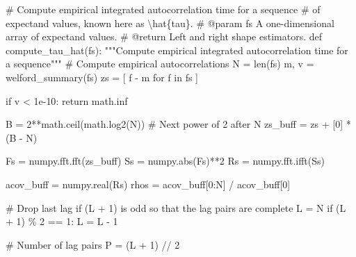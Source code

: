 \documentclass[
  letterpaper,
  DIV=11,
  numbers=noendperiod]{scrartcl}
\newenvironment{Shaded}{\begin{snugshade}}{\end{snugshade}}
\newcommand{\BuiltInTok}[1]{\textcolor[rgb]{0.00,0.23,0.31}{#1}}
\newcommand{\CommentTok}[1]{\textcolor[rgb]{0.37,0.37,0.37}{#1}}
\newcommand{\ControlFlowTok}[1]{\textcolor[rgb]{0.00,0.23,0.31}{#1}}
\newcommand{\DecValTok}[1]{\textcolor[rgb]{0.68,0.00,0.00}{#1}}
\newcommand{\FloatTok}[1]{\textcolor[rgb]{0.68,0.00,0.00}{#1}}
\newcommand{\KeywordTok}[1]{\textcolor[rgb]{0.00,0.23,0.31}{#1}}
\newcommand{\NormalTok}[1]{\textcolor[rgb]{0.00,0.23,0.31}{#1}}
\newcommand{\OperatorTok}[1]{\textcolor[rgb]{0.37,0.37,0.37}{#1}}
\begin{document}
\begin{Shaded}
\begin{Highlighting}[]

\CommentTok{\# Compute empirical integrated autocorrelation time for a sequence}
\CommentTok{\# of expectand values, known here as \textbackslash{}hat\{tau\}.}
\CommentTok{\# @param fs A one{-}dimensional array of expectand values.}
\CommentTok{\# @return Left and right shape estimators.}
\KeywordTok{def}\NormalTok{ compute\_tau\_hat(fs):}
  \CommentTok{"""Compute empirical integrated autocorrelation time for a sequence"""}
  \CommentTok{\# Compute empirical autocorrelations}
\NormalTok{  N }\OperatorTok{=} \BuiltInTok{len}\NormalTok{(fs)}
\NormalTok{  m, v }\OperatorTok{=}\NormalTok{ welford\_summary(fs)}
\NormalTok{  zs }\OperatorTok{=}\NormalTok{ [ f }\OperatorTok{{-}}\NormalTok{ m }\ControlFlowTok{for}\NormalTok{ f }\KeywordTok{in}\NormalTok{ fs ]}
  
  \ControlFlowTok{if}\NormalTok{ v }\OperatorTok{\textless{}} \FloatTok{1e{-}10}\NormalTok{:}
    \ControlFlowTok{return}\NormalTok{ math.inf}
  
\NormalTok{  B }\OperatorTok{=} \DecValTok{2}\OperatorTok{**}\NormalTok{math.ceil(math.log2(N)) }\CommentTok{\# Next power of 2 after N}
\NormalTok{  zs\_buff }\OperatorTok{=}\NormalTok{ zs }\OperatorTok{+}\NormalTok{ [}\DecValTok{0}\NormalTok{] }\OperatorTok{*}\NormalTok{ (B }\OperatorTok{{-}}\NormalTok{ N)}
  
\NormalTok{  Fs }\OperatorTok{=}\NormalTok{ numpy.fft.fft(zs\_buff)}
\NormalTok{  Ss }\OperatorTok{=}\NormalTok{ numpy.}\BuiltInTok{abs}\NormalTok{(Fs)}\OperatorTok{**}\DecValTok{2}
\NormalTok{  Rs }\OperatorTok{=}\NormalTok{ numpy.fft.ifft(Ss)}
  
\NormalTok{  acov\_buff }\OperatorTok{=}\NormalTok{ numpy.real(Rs)}
\NormalTok{  rhos }\OperatorTok{=}\NormalTok{ acov\_buff[}\DecValTok{0}\NormalTok{:N] }\OperatorTok{/}\NormalTok{ acov\_buff[}\DecValTok{0}\NormalTok{]}
  
  \CommentTok{\# Drop last lag if (L + 1) is odd so that the lag pairs are complete}
\NormalTok{  L }\OperatorTok{=}\NormalTok{ N}
  \ControlFlowTok{if}\NormalTok{ (L }\OperatorTok{+} \DecValTok{1}\NormalTok{) }\OperatorTok{\%} \DecValTok{2} \OperatorTok{==} \DecValTok{1}\NormalTok{:}
\NormalTok{    L }\OperatorTok{=}\NormalTok{ L }\OperatorTok{{-}} \DecValTok{1}
  
  \CommentTok{\# Number of lag pairs}
\NormalTok{  P }\OperatorTok{=}\NormalTok{ (L }\OperatorTok{+} \DecValTok{1}\NormalTok{) }\OperatorTok{//} \DecValTok{2}
  

\end{Highlighting}
\end{Shaded}
\end{document}
